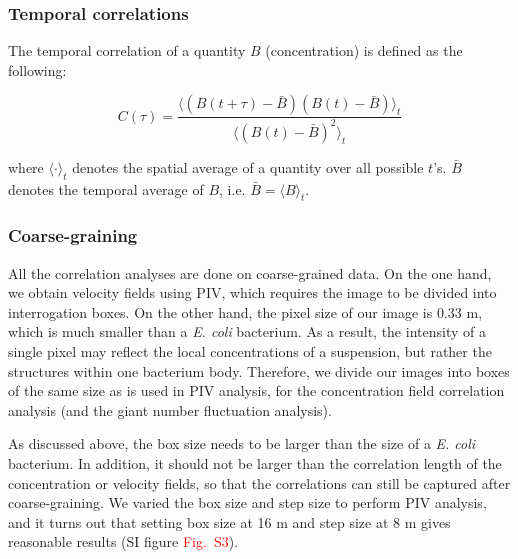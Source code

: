 \documentclass[twocolumn,aps,pre,amsmath,amssymb,floatfix,longbibliography]{revtex4-1}
\begin{document}
\subsubsection{Temporal correlations}
The temporal correlation of a quantity $B$ (concentration) is defined as the following:

$$ C(\tau) = \frac{\langle (B(t+\tau)-\bar B)(B(t)-\bar B)\rangle_t}{\langle(B(t)-\bar B)^2\rangle_t} $$

where $\langle\cdot\rangle_{t}$ denotes the spatial average of a quantity over all possible $t$'s.  $\bar B$ denotes the temporal average of $B$, i.e. $\bar B=\langle B\rangle_{t}$.

\subsubsection{Coarse-graining}
All the correlation analyses are done on coarse-grained data. On the one hand, we obtain velocity fields using PIV, which requires the image to be divided into interrogation boxes. On the other hand, the pixel size of our image is 0.33 \textmu m, which is much smaller than a \textit{E. coli} bacterium. As a result, the intensity of a single pixel may reflect the local concentrations of a suspension, but rather the structures within one bacterium body. Therefore, we divide our images into boxes of the same size as is used in PIV analysis, for the concentration field correlation analysis (and the giant number fluctuation analysis).

As discussed above, the box size needs to be larger than the size of a \textit{E. coli} bacterium. In addition, it should not be larger than the correlation length of the concentration or velocity fields, so that the correlations can still be captured after coarse-graining. We varied the box size and step size to perform PIV analysis, and it turns out that setting box size at 16 \textmu m and step size at 8 \textmu m gives reasonable results (SI figure \textcolor{red}{Fig.~S3}).
\end{document}
